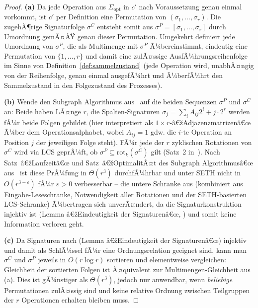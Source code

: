 ﻿\documentclass[a4paper,12pt]{article}
\theoremstyle{definition}
\begin{document}
\begin{proof}
	\textbf{(a)} Da jede Operation aus $\Sigma_{\mathrm{opt}}$ in $c'$ nach Voraussetzung
	genau einmal vorkommt, ist $c'$ per Definition eine Permutation von
	$(\sigma_1,\ldots,\sigma_r)$. Die zugehÃ¶rige Signaturfolge $\sigma^{C}$ entsteht somit
	aus $\sigma^{P}=[\sigma_1,\ldots,\sigma_r]$ durch Umordnung gemÃ¤ÃŸ genau dieser
	Permutation. Umgekehrt definiert jede Umordnung von $\sigma^{P}$, die als Multimenge
	mit $\sigma^{P}$ Ã¼bereinstimmt, eindeutig eine Permutation von
	$\{1,\ldots,r\}$ und damit eine zulÃ¤ssige AusfÃ¼hrungsreihenfolge im Sinne von
	Definition~\ref{def:sammelzustand} (jede Operation wird, unabhÃ¤ngig von der
	Reihenfolge, genau einmal ausgefÃ¼hrt und Ã¼berfÃ¼hrt den Sammelzustand in den
	Folgezustand des Prozesses).

	\textbf{(b)} Wende den Subgraph Algorithmus aus~\cite{epp2026subgraph} auf die beiden
	Sequenzen $\sigma^{P}$ und $\sigma^{C}$ an: Beide haben LÃ¤nge $r$, die
	Spalten-Signaturen $\sigma_j = \sum_i A_{ij}2^i + j\cdot 2^r$ werden fÃ¼r beide Folgen
	gebildet (hier interpretiert als $1\times r$-â€žAdjazenzmatrizenâ€œ Ã¼ber dem
	Operationsalphabet, wobei $A_{ij}=1$ gdw. die $i$-te Operation an Position $j$ der
	jeweiligen Folge steht). FÃ¼r jede der $r$ zyklischen Rotationen von $\sigma^{C}$ wird
	via LCS geprÃ¼ft, ob $\sigma^{P}\subseteq\mathrm{rot}_k(\sigma^{C})$ gilt
	(Satz~2 in~\cite{epp2026subgraph}). Nach Satz~â€žLaufzeitâ€œ und
	Satz~â€žOptimalitÃ¤t des Subgraph Algorithmusâ€œ aus~\cite{epp2026subgraph} ist diese
	PrÃ¼fung in $\Theta(r^3)$ durchfÃ¼hrbar und unter SETH nicht in
	$O(r^{3-\varepsilon})$ fÃ¼r $\varepsilon>0$ verbesserbar -- die untere Schranke aus
	\cite{epp2026subgraph} (kombiniert aus Eingabe-Leseschranke, Notwendigkeit aller
	Rotationen und der SETH-basierten LCS-Schranke) Ã¼bertragen sich unverÃ¤ndert, da die
	Signaturkonstruktion injektiv ist (Lemma â€žEindeutigkeit der Signaturenâ€œ,
	\cite{epp2026subgraph}) und somit keine Information verloren geht.

	\textbf{(c)} Da Signaturen nach \cite{epp2026subgraph} (Lemma â€žEindeutigkeit der
	Signaturenâ€œ) injektiv und damit als SchlÃ¼ssel fÃ¼r eine Ordnungsrelation geeignet sind,
	kann man $\sigma^{C}$ und $\sigma^{P}$ jeweils in $O(r\log r)$ sortieren und
	elementweise vergleichen: Gleichheit der sortierten Folgen ist Ã¤quivalent zur
	Multimengen-Gleichheit aus (a). Dies ist gÃ¼nstiger als $\Theta(r^3)$, jedoch nur
	anwendbar, wenn \emph{beliebige} Permutationen zulÃ¤ssig sind und keine relative
	Ordnung zwischen Teilgruppen der $r$ Operationen erhalten bleiben muss. \qedhere
\end{proof}
\end{document}
